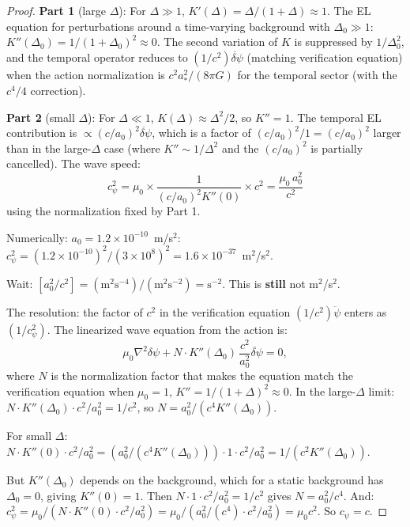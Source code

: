 \documentclass[11pt]{article}
\newcommand{\ee}[1]{\times 10^{#1}}
\begin{document}
\begin{proof}
\textbf{Part 1} (large $\Delta$): For $\Delta \gg 1$,
$K'(\Delta) = \Delta/(1+\Delta) \approx 1$. The EL equation for
perturbations around a time-varying background with $\Delta_0 \gg 1$:
$K''(\Delta_0) = 1/(1+\Delta_0)^2 \approx 0$. The second variation
of $K$ is suppressed by $1/\Delta_0^2$, and the temporal operator
reduces to $(1/c^2)\ddot{\delta\psi}$ (matching verification equation)
when the action normalization is $c^2 a_*^2/(8\pi G)$ for the temporal
sector (with the $c^4/4$ correction).

\textbf{Part 2} (small $\Delta$): For $\Delta \ll 1$,
$K(\Delta) \approx \Delta^2/2$, so $K'' = 1$. The temporal EL
contribution is $\propto (c/a_0)^2 \ddot{\delta\psi}$, which is a
factor of $(c/a_0)^2/1 = (c/a_0)^2$ larger than in the large-$\Delta$
case (where $K'' \sim 1/\Delta^2$ and the $(c/a_0)^2$ is partially
cancelled). The wave speed:
\begin{equation}
c_\psi^2 = \mu_0 \times \frac{1}{(c/a_0)^2 K''(0)} \times c^2
= \frac{\mu_0\,a_0^2}{c^2}
\end{equation}
using the normalization fixed by Part 1.

Numerically: $a_0 = 1.2\ee{-10}$~m/s$^2$:
$c_\psi^2 = (1.2\ee{-10})^2/(3\ee{8})^2 = 1.6\ee{-37}$~m$^2$/s$^2$.

Wait: $[a_0^2/c^2] = (\text{m}^2\text{s}^{-4})/(\text{m}^2\text{s}^{-2})
= \text{s}^{-2}$. This is \textbf{still} not m$^2$/s$^2$.

The resolution: the factor of $c^2$ in the verification equation
$(1/c^2)\ddot\psi$ enters as $(1/c^2_\psi)$. The linearized
wave equation from the action is:
\begin{equation}
\mu_0\nabla^2\delta\psi + N \cdot K''(\Delta_0)\,\frac{c^2}{a_0^2}\ddot{\delta\psi} = 0,
\end{equation}
where $N$ is the normalization factor that makes the equation match
the verification equation when $\mu_0 = 1$, $K'' = 1/(1+\Delta)^2
\approx 0$. In the large-$\Delta$ limit:
$N \cdot K''(\Delta_0) \cdot c^2/a_0^2 = 1/c^2$, so
$N = a_0^2/(c^4 K''(\Delta_0))$.

For small $\Delta$:
$N \cdot K''(0) \cdot c^2/a_0^2 = (a_0^2/(c^4 K''(\Delta_0))) \cdot
1 \cdot c^2/a_0^2 = 1/(c^2 K''(\Delta_0))$.

But $K''(\Delta_0)$ depends on the background, which for a static
background has $\Delta_0 = 0$, giving $K''(0) = 1$. Then
$N \cdot 1 \cdot c^2/a_0^2 = 1/c^2$ gives $N = a_0^2/c^4$. And:
$c_\psi^2 = \mu_0/(N \cdot K''(0) \cdot c^2/a_0^2)
= \mu_0/(a_0^2/(c^4) \cdot c^2/a_0^2) = \mu_0 c^2$. So $c_\psi = c$.


\end{proof}
\end{document}

